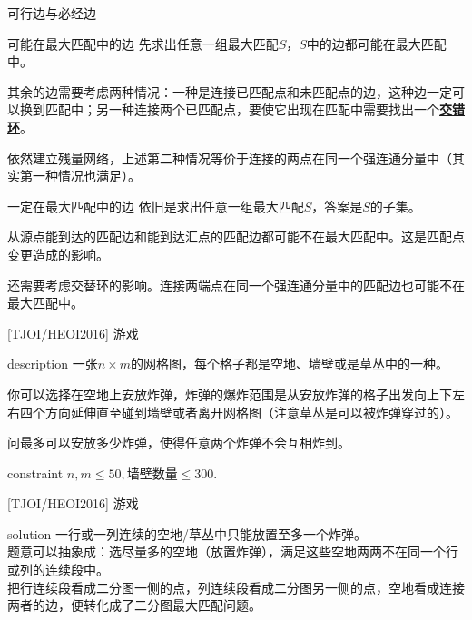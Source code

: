 \documentclass{beamer}
\def\obj#1{\textbf{\uline{#1}}}
\def\le{\leqslant}
\begin{document}
\begin{frame}{可行边与必经边}
	\begin{block}{可能在最大匹配中的边}
		\pause
		先求出任意一组最大匹配$S$，$S$中的边都可能在最大匹配中。
		
		其余的边需要考虑两种情况：一种是连接已匹配点和未匹配点的边，这种边一定可以换到匹配中；另一种连接两个已匹配点，要使它出现在匹配中需要找出一个\obj{交错环}。
		
		依然建立残量网络，上述第二种情况等价于连接的两点在同一个强连通分量中（其实第一种情况也满足）。
	\end{block}
	\pause
	\begin{block}{一定在最大匹配中的边}
		\pause
		依旧是求出任意一组最大匹配$S$，答案是$S$的子集。
		
		从源点能到达的匹配边和能到达汇点的匹配边都可能不在最大匹配中。这是匹配点变更造成的影响。
		
		还需要考虑交替环的影响。连接两端点在同一个强连通分量中的匹配边也可能不在最大匹配中。
	\end{block}
\end{frame}
\begin{frame}{[TJOI/HEOI2016] 游戏}
	\begin{block}{description}
		一张$n \times m$的网格图，每个格子都是空地、墙壁或是草丛中的一种。
		
		你可以选择在空地上安放炸弹，炸弹的爆炸范围是从安放炸弹的格子出发向上下左右四个方向延伸直至碰到墙壁或者离开网格图（注意草丛是可以被炸弹穿过的）。
		
		问最多可以安放多少炸弹，使得任意两个炸弹不会互相炸到。
	\end{block}
	\begin{block}{constraint}
		$n, m \le 50, \mbox{墙壁数量}\le 300.$
	\end{block}
\end{frame}
\begin{frame}{[TJOI/HEOI2016] 游戏}
	\begin{block}{solution}
		一行或一列连续的空地/草丛中只能放置至多一个炸弹。\\
		
		题意可以抽象成：选尽量多的空地（放置炸弹），满足这些空地两两不在同一个行或列的连续段中。\\
		
		把行连续段看成二分图一侧的点，列连续段看成二分图另一侧的点，空地看成连接两者的边，便转化成了二分图最大匹配问题。
	\end{block}
\end{frame}
\end{document}
